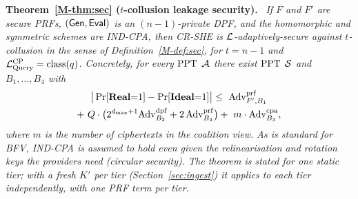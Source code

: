 \documentclass[11pt,a4paper]{article}
\newcommand{\mref}[1]{\ref{M-#1}}
\newenvironment{restated}[1]{\par\medskip\noindent\textbf{#1.}\ \itshape}{\par\medskip}
\begin{document}
\begin{restated}{Theorem~\mref{thm:sec} ($t$-collusion leakage security)}
If $F$ and $F'$ are secure PRFs, $(\mathsf{Gen},\mathsf{Eval})$ is an $(n{-}1)$-private DPF, and the
homomorphic and symmetric schemes are IND-CPA, then CR-SHE is
$\mathcal{L}$-adaptively-secure against $t$-collusion in the sense of
Definition~\mref{def:sec}, for $t=n-1$ and
$\mathcal{L}^{\text{CP}}_{\mathrm{Query}}=\mathrm{class}(q)$. Concretely, for every
$\mathrm{PPT}$ $\mathcal{A}$ there exist $\mathrm{PPT}$ $\mathcal{S}$ and $B_1,\dots,B_4$ with
\begin{multline*}
\big|\Pr[\mathbf{Real}{=}1]-\Pr[\mathbf{Ideal}{=}1]\big|
\le\ \mathrm{Adv}^{\mathrm{prf}}_{F',B_1}\\
+\ Q\cdot\big(2^{d_{\max}+1}\mathrm{Adv}^{\mathrm{dpf}}_{B_2}
+2\,\mathrm{Adv}^{\mathrm{prf}}_{B_4}\big)
+\ m\cdot\mathrm{Adv}^{\mathrm{cpa}}_{B_3},
\end{multline*}
where $m$ is the number of ciphertexts in the coalition view. As is standard
for BFV, IND-CPA is assumed to hold even given the relinearisation and
rotation keys the providers need (circular security). The theorem is stated
for one static tier; with a fresh $K'$ per tier
(Section~\ref{sec:ingest}) it applies to each tier independently, with one PRF
term per tier.
\end{restated}
\end{document}
